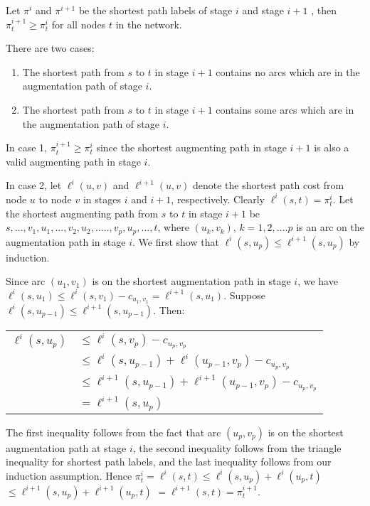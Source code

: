  Let $\pi^i$ and $\pi^{i+1}$ be the shortest
path labels of stage $i$ and stage $i+1$ , then $\pi^{i+1}_t \geq
\pi^i_t$ for all nodes $t$ in the network.

\proof There are two cases:
\begin{enumerate}

\item The shortest path from $s$ to $t$ in stage $i+1$ contains no
arcs which are in the augmentation path of stage $i$.

\item The shortest path from $s$ to $t$ in stage $i+1$ contains some
arcs which are in the augmentation path of stage $i$.

\end{enumerate}

In case 1, $\pi^{i+1}_t \geq \pi^i_t$ since the shortest augmenting
path in stage $i+1$ is also a valid augmenting path in stage $i$.

In case 2, let $\ell^i(u,v)$ and $\ell^{i+1}(u,v)$ denote the shortest
path cost from node $u$ to node $v$ in stages $i$ and $i+1$,
respectively. Clearly $\ell^i(s,t) = \pi^i_t$.  Let the shortest
augmenting path from $s$ to $t$ in stage $i+1$ be
$s,...,v_1,u_1,...,v_2,u_2, ....., v_p,u_p,...,t$, where $(u_k,v_k)$,
$k =1,2, .... p$ is an arc on the augmentation path in stage $i$.  We
first show that $\ell^i(s,u_p)\leq \ell^{i+1}(s,u_p)$ by induction.

Since arc $(u_1,v_1)$ is on the shortest augmentation path in stage
$i$, we have $\ell^i(s,u_1)\leq \ell^i(s,v_1) - c_{u_1,v_1} =
\ell^{i+1}(s,u_1)$.  Suppose $\ell^i(s,u_{p-1})\leq
\ell^{i+1}(s,u_{p-1})$. Then:

\begin{tabular}{ll}
$\ell^i(s,u_p)$&$\leq \ell^i(s,v_p) - c_{u_p,v_p}$\\
&$\leq \ell^i(s,u_{p-1}) + \ell^i(u_{p-1},v_p) - c_{u_p,v_p}$\\
&$\leq \ell^{i+1}(s,u_{p-1}) + \ell^{i+1}(u_{p-1},v_p) - c_{u_p,v_p}$\\
&$= \ell^{i+1}(s,u_p)$\\
\end{tabular}

\noindent
The first inequality follows from the fact that arc $(u_p,v_p)$ is on
the shortest augmentation path at stage $i$, the second inequality
follows from the triangle inequality for shortest path labels, and the
last inequality follows from our induction assumption.  Hence $\pi^i_t
= \ell^i(s,t) \leq \ell^i(s,u_p) + \ell^i(u_p,t)$ $\leq
\ell^{i+1}(s,u_p) + \ell^{i+1}(u_p,t)$ $= \ell^{i+1}(s,t)=
\pi^{i+1}_t$.  \bull

